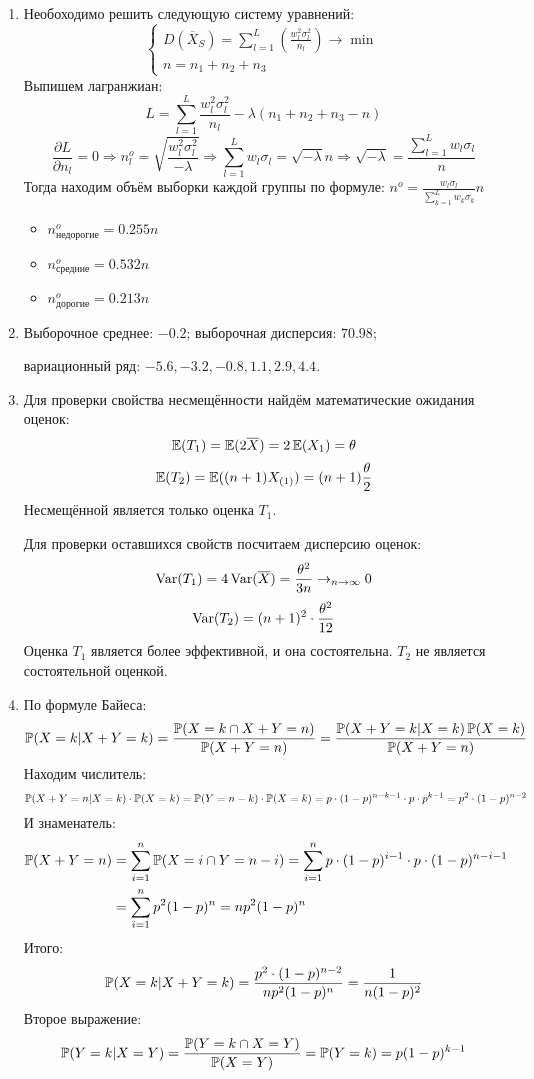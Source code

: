 \begin{enumerate}

\item Необоходимо решить следующую систему уравнений:
\[
\begin{cases}
D(\overline{X}_S) = \sum_{l=1}^L \left(\frac{w_l^2 \sigma_l^2}{n_l} \right) \to \min \\
n = n_1 + n_2 + n_3
\end{cases}
\]
Выпишем лагранжиан:
\[
L  = \sum_{l=1}^L \frac{w_l^2 \sigma_l^2}{n_l} - \lambda(n_1 + n_2 + n_3 -n)
\]
\[
\frac{\partial L}{\partial n_l} = 0 \Rightarrow n_l^o = \sqrt{\frac{w_l^2 \sigma_l^2}{-\lambda}} \Rightarrow \sum_{l=1}^L w_l \sigma_l = \sqrt{-\lambda} n \Rightarrow \sqrt{-\lambda} = \frac{\sum_{l=1}^L w_l \sigma_l }{n}
\]
Тогда находим объём выборки каждой группы по формуле: $n^o = \frac{w_l \sigma_l }{\sum_{k=1}^L w_k \sigma_k } n$
\begin{itemize}
\item $n^o_{\text{недорогие}} = 0.255n$
\item $n^o_{\text{средние}} = 0.532n$
\item $n^o_{\text{дорогие}} = 0.213n$
\end{itemize}
\item Выборочное среднее: $-0.2$; выборочная дисперсия: $70.98$;

вариационный ряд: $-5.6, -3.2, -0.8, 1.1, 2.9, 4.4$.
\item Для проверки свойства несмещённости найдём математические ожидания оценок:
\[
\E(T_1) = \E(2\overline{X}) = 2\E(X_1) = \theta
\]
\[
\E(T_2) = \E((n+1)X_{(1)}) = (n+1) \frac{\theta}{2}
\]
Несмещённой является только оценка $T_1$.

Для проверки оставшихся свойств посчитаем дисперсию оценок:
\[
\Var(T_1) = 4\Var(\overline{X}) = \frac{\theta^2}{3n} \to_{n \to \infty} 0
\]
\[
\Var(T_2) = (n+1)^2 \cdot \frac{\theta^2}{12}
\]
Оценка $T_1$ является более эффективной, и она состоятельна. $T_2$ не является состоятельной оценкой.
\item По формуле Байеса:
\[
\P(X=k | X+Y = k) = \frac{\P(X=k \cap X+Y = n)}{\P(X+Y=n)} = \frac{\P(X+Y = k | X=k)\P(X=k)}{\P(X+Y=n)}
\]
Находим числитель:
\[
\P(X+Y = n | X=k) \cdot \P(X=k) = \P(Y = n-k) \cdot \P(X=k) = p\cdot (1-p)^{n-k-1} \cdot p \cdot p^{k-1} = p^2 \cdot (1-p)^{n-2}
\]
И знаменатель:
\begin{align*}
\P(X+Y = n) &= \sum_{i=1}^n \P(X = i \cap Y = n-i) =  \sum_{i=1}^n p \cdot (1-p)^{i-1} \cdot p \cdot (1-p)^{n-i-1} \\
&= \sum_{i=1}^n p^2 (1-p)^n = np^2 (1-p)^n
\end{align*}
Итого:
\[
\P(X=k | X+Y = k) = \frac{ p^2 \cdot (1-p)^{n-2}}{np^2 (1-p)^n} = \frac{1}{n(1-p)^2}
\]
Второе выражение:
\[
\P(Y=k | X=Y) = \frac{\P(Y=k \cap X=Y)}{\P(X=Y)} = \P(Y=k) = p(1-p)^{k-1}
\]
\end{enumerate}




